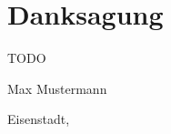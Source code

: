 

\thispagestyle{plain}
\chapter{Danksagung}

TODO

\vspace{2cm}


\begin{flushleft}
    Max Mustermann
\end{flushleft}
Eisenstadt, \thesisDate

